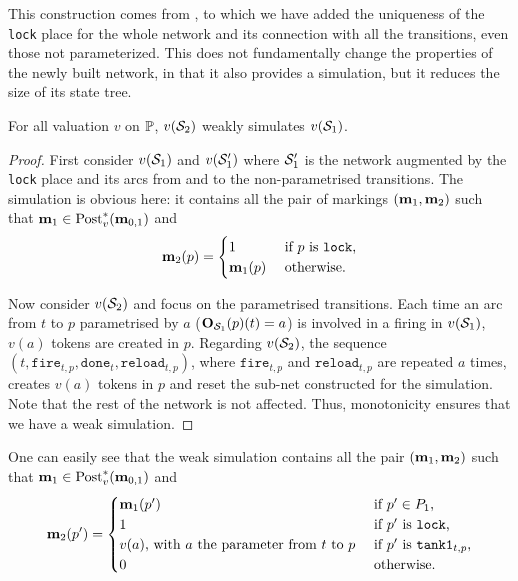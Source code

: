 This construction comes from \cite{David17}, to which we have added the uniqueness of the \texttt{lock} place for the whole network and its connection with all the transitions, even those not parameterized.
This does not fundamentally change the properties of the newly built network, in that it also provides a simulation, but it reduces the size of its state tree.

\begin{lemm}
  For all valuation $v$ on $\parameters$, $v(\namePPN[2])$ weakly simulates $v(\namePPN[1])$.
\end{lemm}

\begin{proof}
  First consider $v(\namePPN[1])$ and $v(\namePPN[1]')$ where $\namePPN[1]'$ is the network augmented by the \texttt{lock} place and its arcs from and to the non-parametrised transitions.
  The simulation is obvious here: it contains all the pair of markings $(\mar_1, \mar_2)$ such that $\mar_1 \in \Post^*_v(\mar_{0,1})$ and
  \[
    \mar_2(p) =
      \begin{cases}
        1 &\text{ if $p$ is \texttt{lock},} \\
        \mar_1(p) &\text{ otherwise.}
      \end{cases}
  \]

  Now consider $v(\namePPN[2])$ and focus on the parametrised transitions.
  Each time an arc from $t$ to $p$ parametrised by $a$ ($\matO_{\namePPN[1]}(p)(t) = a$) is involved in a firing in $v(\namePPN[1])$, $v(a)$ tokens are created in $p$.
  Regarding $v(\namePPN[2])$, the sequence $(t, \mathtt{fire}_{t,p}, \mathtt{done}_t, \mathtt{reload}_{t,p})$, where $\mathtt{fire}_{t,p}$ and $\mathtt{reload}_{t,p}$ are repeated $a$ times, creates $v(a)$ tokens in $p$ and reset the sub-net constructed for the simulation. Note that the rest of the network is not affected. Thus, monotonicity ensures that we have a weak simulation.
\end{proof}

One can easily see that the weak simulation contains all the pair $(\mar_1, \mar_2)$ such that $\mar_1 \in \Post^*_v(\mar_{0,1})$ and
\[
  \mar_2(p') =
    \begin{cases}
      \mar_1(p') &\text{ if } p' \in \places_1 \text{,}\\
      1 &\text{ if $p'$ is \texttt{lock},} \\
      v(a)\text{, with $a$ the parameter from $t$ to $p$} &\text{ if $p'$ is }\mathtt{tank1}_{t,p}\text{,} \\
      0 &\text{ otherwise.}
    \end{cases}
\]

